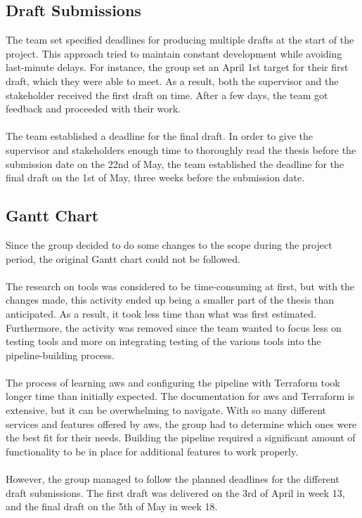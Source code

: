 \subsection{Draft Submissions}
The team set specified deadlines for producing multiple drafts at the start of the project. This approach tried to maintain constant development while avoiding last-minute delays. For instance, the group set an April 1st target for their first draft, which they were able to meet. As a result, both the supervisor and the stakeholder received the first draft on time. After a few days, the team got feedback and proceeded with their work. 
\\~\\
The team established a deadline for the final draft. In order to give the supervisor and stakeholders enough time to thoroughly read the thesis before the submission date on the 22nd of May, the team established the deadline for the final draft on the 1st of May, three weeks before the submission date. 


\subsection{Gantt Chart}
Since the group decided to do some changes to the scope during the project period, the original Gantt chart could not be followed. 
\\~\\
The research on tools was considered to be time-consuming at first, but with the changes made, this activity ended up being a smaller part of the thesis than anticipated. As a result, it took less time than what was first estimated. Furthermore, the  activity was removed since the team wanted to focus less on testing tools and more on integrating testing of the various tools into the pipeline-building process. 
\\~\\
The process of learning \acrshort{aws} and configuring the pipeline with Terraform took longer time than initially expected.
The documentation for \acrshort{aws} and Terraform is extensive, but it can be overwhelming to navigate. With so many different services and features offered by \acrshort{aws}, the group had to determine which ones were the best fit for their needs. Building the pipeline required a significant amount of functionality to be in place for additional features to work properly. 
\\~\\
However, the group managed to follow the planned deadlines for the different draft submissions. The first draft was delivered on the 3rd of April in week 13, and the final draft on the 5th of May in week 18. 

